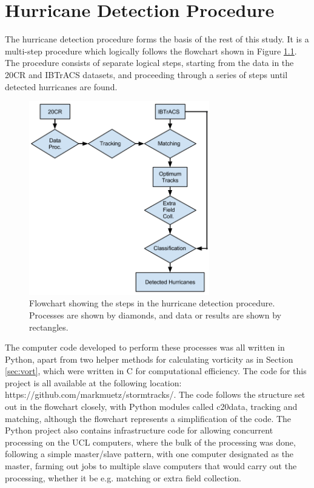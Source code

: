 \documentclass[pdftex,12pt,a4paper]{report}
\begin{document}
\chapter{Hurricane Detection Procedure}
\label{chap:hurricane_detection_proc}


The hurricane detection procedure forms the basis of the rest of this study. It is a multi-step
procedure which logically follows the flowchart shown in Figure \ref{fig:hurricane_detection_proc}.
The procedure consists of separate logical steps, starting from the data in the 20CR and IBTrACS
datasets, and proceeding through a series of steps until detected hurricanes are found. 

\begin{figure}[ht!]
    \centering
    \includegraphics[width=0.7\textwidth]{figures/hurricane_detection_procedure}
    \caption{Flowchart showing the steps in the hurricane detection procedure. Processes are shown
    by diamonds, and data or results are shown by rectangles. }
    \label{fig:hurricane_detection_proc}
\end{figure}

\newpage
The computer code developed to perform these processes was all written in Python, apart from two
helper methods for calculating vorticity as in Section \ref{sec:vort}, which were written in C for
computational efficiency. The code for this project is all available at the following location:
https://github.com/markmuetz/stormtracks/. The code follows the structure set out in the flowchart
closely, with Python modules called c20data, tracking and matching, although the flowchart
represents a simplification of the code. The Python project also contains infrastructure code for
allowing concurrent processing on the UCL computers, where the bulk of the processing was done,
following a simple master/slave pattern, with one computer designated as the master, farming out
jobs to multiple slave computers that would carry out the processing, whether it be e.g. matching or
extra field collection. 
\end{document}
